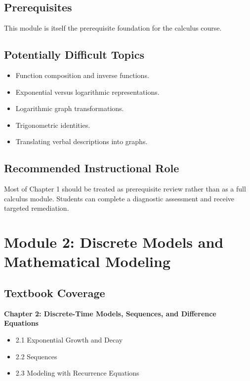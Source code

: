 \documentclass[11pt]{article}
\begin{document}
\subsection{Prerequisites}

This module is itself the prerequisite foundation for the calculus course.

\subsection{Potentially Difficult Topics}

\begin{itemize}
    \item Function composition and inverse functions.
    \item Exponential versus logarithmic representations.
    \item Logarithmic graph transformations.
    \item Trigonometric identities.
    \item Translating verbal descriptions into graphs.
\end{itemize}

\subsection{Recommended Instructional Role}

Most of Chapter 1 should be treated as prerequisite review rather than as a
full calculus module. Students can complete a diagnostic assessment and
receive targeted remediation.

\section{Module 2: Discrete Models and Mathematical Modeling}

\subsection{Textbook Coverage}

\textbf{Chapter 2: Discrete-Time Models, Sequences, and Difference Equations}

\begin{itemize}
    \item 2.1 Exponential Growth and Decay
    \item 2.2 Sequences
    \item 2.3 Modeling with Recurrence Equations
\end{itemize}
\end{document}
